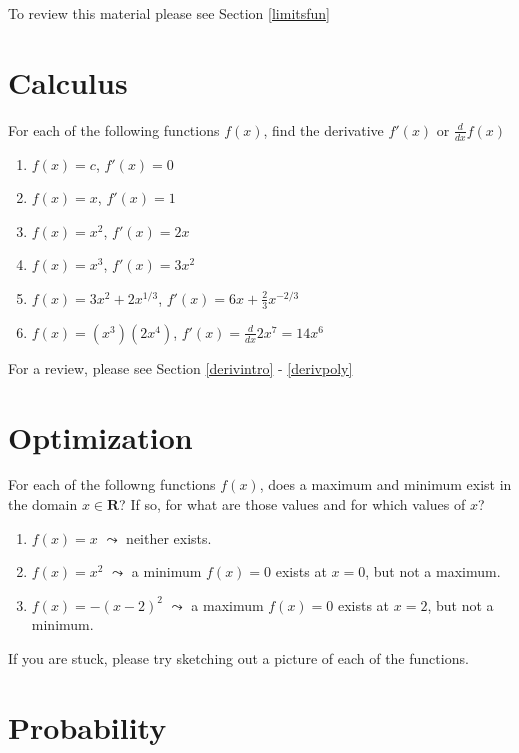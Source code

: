 \documentclass[]{book}
\providecommand{\tightlist}{%
  \setlength{\itemsep}{0pt}\setlength{\parskip}{0pt}}
\theoremstyle{definition}
\theoremstyle{definition}
\theoremstyle{definition}
\theoremstyle{remark}
\begin{document}
To review this material please see Section \ref{limitsfun}

\section*{Calculus}\label{calculus-1}

For each of the following functions \(f(x)\), find the derivative
\(f'(x)\) or \(\frac{d}{dx}f(x)\)

\begin{enumerate}
\def\labelenumi{\arabic{enumi}.}
\tightlist
\item
  \(f(x)=c\), \(f'(x) = 0\)
\item
  \(f(x)=x\), \(f'(x) = 1\)
\item
  \(f(x)=x^2\), \(f'(x) = 2x\)
\item
  \(f(x)=x^3\), \(f'(x) = 3x^2\)
\item
  \(f(x)=3x^2+2x^{1/3}\), \(f'(x) = 6x + \frac{2}{3}x^{-2/3}\)
\item
  \(f(x)=(x^3)(2x^4)\), \(f'(x) = \frac{d}{dx}2x^7 = 14x^6\)
\end{enumerate}

For a review, please see Section \ref{derivintro} - \ref{derivpoly}

\section*{Optimization}\label{optimization-1}

For each of the followng functions \(f(x)\), does a maximum and minimum
exist in the domain \(x \in \mathbf{R}\)? If so, for what are those
values and for which values of \(x\)?

\begin{enumerate}
\def\labelenumi{\arabic{enumi}.}
\tightlist
\item
  \(f(x) = x\) \(\leadsto\) neither exists.
\item
  \(f(x) = x^2\) \(\leadsto\) a minimum \(f(x) = 0\) exists at
  \(x = 0\), but not a maximum.
\item
  \(f(x) = -(x - 2)^2\) \(\leadsto\) a maximum \(f(x) = 0\) exists at
  \(x = 2\), but not a minimum.
\end{enumerate}

If you are stuck, please try sketching out a picture of each of the
functions.

\section*{Probability}\label{probability-1}
\end{document}
